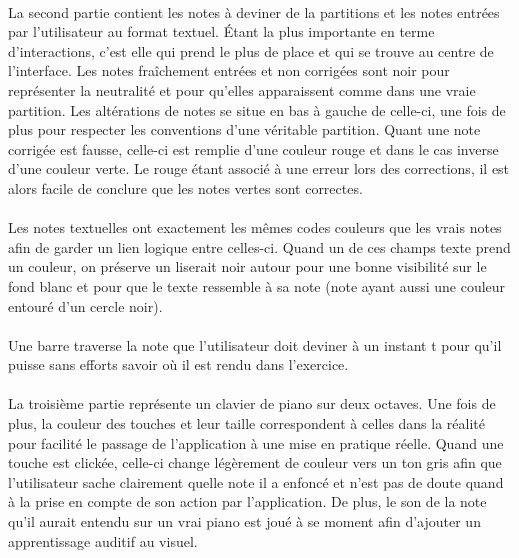 \documentclass[a4paper, 12pt]{article}
\begin{document}
    \paragraph{}
    La second partie contient les notes à deviner de la partitions et les notes entrées par l'utilisateur au format textuel. Étant la plus importante en terme d'interactions, c'est elle qui prend le plus de place et qui se trouve au centre de l'interface. Les notes fraîchement entrées et non corrigées sont noir pour représenter la neutralité et pour qu'elles apparaissent comme dans une vraie partition. Les altérations de notes se situe en bas à gauche de celle-ci, une fois de plus pour respecter les conventions d'une véritable partition. Quant une note corrigée est fausse, celle-ci est remplie d'une couleur rouge et dans le cas inverse d'une couleur verte. Le rouge étant associé à une erreur lors des corrections, il est alors facile de conclure que les notes vertes sont correctes.
    
    \paragraph{}
    Les notes textuelles ont exactement les mêmes codes couleurs que les vrais notes afin de garder un lien logique entre celles-ci. Quand un de ces champs texte prend un couleur, on préserve un liserait noir autour pour une bonne visibilité sur le fond blanc et pour que le texte ressemble à sa note (note ayant aussi une couleur entouré d'un cercle noir).
    
    \paragraph{}
    Une barre traverse la note que l'utilisateur doit deviner à un instant t pour qu'il puisse sans efforts savoir où il est rendu dans l'exercice. 
    
    \paragraph{}
    La troisième partie représente un clavier de piano sur deux octaves. Une fois de plus, la couleur des touches et leur taille correspondent à celles dans la réalité pour facilité le passage de l'application à une mise en pratique réelle. Quand une touche est clickée, celle-ci change légèrement de couleur vers un ton gris afin que l'utilisateur sache clairement quelle note il a enfoncé et n'est pas de doute quand à la prise en compte de son action par l'application. De plus, le son de la note qu'il aurait entendu sur un vrai piano est joué à se moment afin d'ajouter un apprentissage auditif au visuel.
    
\end{document}
